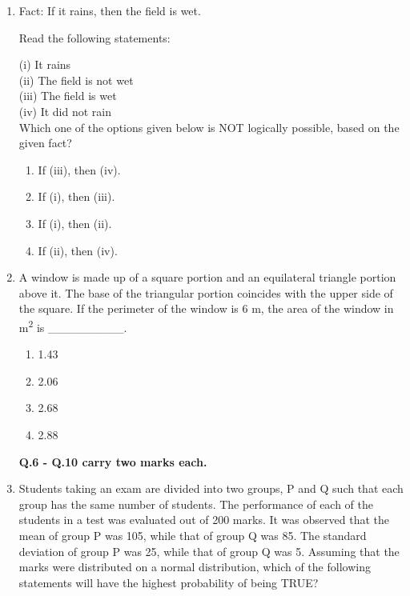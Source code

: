 \documentclass[journal,12pt,onecolumn]{IEEEtran}
\begin{document}
\begin{enumerate}
\item Fact: If it rains, then the field is wet.  

Read the following statements:  

(i) It rains  \\
(ii) The field is not wet  \\
(iii) The field is wet  \\
(iv) It did not rain  \\

Which one of the options given below is NOT logically possible, based on the given fact?  

\hfill{}  

\begin{multicols}{2}
\begin{enumerate}
\item If (iii), then (iv).  
\item If (i), then (iii).  
\item If (i), then (ii).  
\item If (ii), then (iv).  
\end{enumerate}
\end{multicols}

\item A window is made up of a square portion and an equilateral triangle portion above it. The base of the triangular portion coincides with the upper side of the square. If the perimeter of the window is 6 m, the area of the window in m\textsuperscript{2} is \_\_\_\_\_\_\_\_\_.  

\hfill{}  

\begin{multicols}{4}
\begin{enumerate}
\item 1.43
\item 2.06
\item 2.68
\item 2.88
\end{enumerate}
\end{multicols}




\newpage

\textbf{Q.6 - Q.10 carry two marks each.}



\item Students taking an exam are divided into two groups, P and Q such that each group has the same number of students. The performance of each of the students in a test was evaluated out of 200 marks. It was observed that the mean of group P was 105, while that of group Q was 85. The standard deviation of group P was 25, while that of group Q was 5. Assuming that the marks were distributed on a normal distribution, which of the following statements will have the highest probability of being TRUE?


\end{enumerate}
\end{document}
